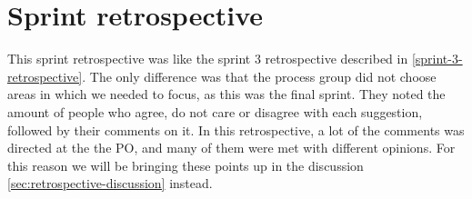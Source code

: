 \section{Sprint retrospective}\label{sec:sprint-4-retrospective}
This sprint retrospective was like the sprint 3 retrospective described in \autoref{sprint-3-retrospective}.
The only difference was that the process group did not choose areas in which we needed to focus, as this was the final sprint.
They noted the amount of people who agree, do not care or disagree with each suggestion, followed by their comments on it.
In this retrospective, a lot of the comments was directed at the the PO, and many of them were met with different opinions. 
For this reason we will be bringing these points up in the discussion \autoref{sec:retrospective-discussion} instead.
